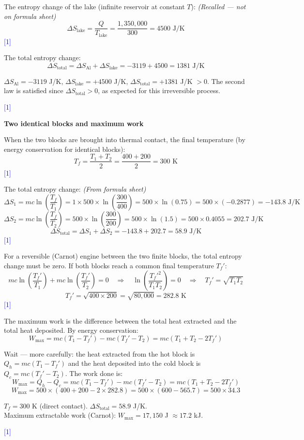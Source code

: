 \documentclass[12pt,a4paper]{article}
\newcommand{\markstep}[1]{\hfill\textcolor{blue}{[#1]}}
\newcommand{\finalanswer}[1]{%
  \begin{tcolorbox}[colback=green!5!white,colframe=green!50!black,boxrule=0.5pt]
  #1
  \end{tcolorbox}
}
\newcommand{\fromsheet}{\textit{(From formula sheet)}}
\newcommand{\recalled}{\textit{(Recalled --- not on formula sheet)}}
\begin{document}
\begin{parts}
The entropy change of the lake (infinite reservoir at constant $T$): \recalled
\[
\Delta S_{\text{lake}} = \frac{Q}{T_{\text{lake}}} = \frac{1{,}350{,}000}{300} = 4500\text{ J/K}
\]
\markstep{1}

The total entropy change:
\[
\Delta S_{\text{total}} = \Delta S_{\text{Al}} + \Delta S_{\text{lake}} = -3119 + 4500 = 1381\text{ J/K}
\]

\finalanswer{$\Delta S_{\text{Al}} = -3119$ J/K, \quad $\Delta S_{\text{lake}} = +4500$ J/K, \quad $\Delta S_{\text{total}} = +1381$ J/K $> 0$. The second law is satisfied since $\Delta S_{\text{total}} > 0$, as expected for this irreversible process.}
\markstep{1}

\item \textbf{Two identical blocks and maximum work} 

When the two blocks are brought into thermal contact, the final temperature (by energy conservation for identical blocks):
\[
T_f = \frac{T_1 + T_2}{2} = \frac{400 + 200}{2} = 300\text{ K}
\]
\markstep{1}

The total entropy change: \fromsheet
\[
\Delta S_1 = mc\ln\!\left(\frac{T_f}{T_1}\right) = 1\times 500\times\ln\!\left(\frac{300}{400}\right) = 500\times\ln(0.75) = 500\times(-0.2877) = -143.8\text{ J/K}
\]
\[
\Delta S_2 = mc\ln\!\left(\frac{T_f}{T_2}\right) = 500\times\ln\!\left(\frac{300}{200}\right) = 500\times\ln(1.5) = 500\times 0.4055 = 202.7\text{ J/K}
\]
\[
\Delta S_{\text{total}} = \Delta S_1 + \Delta S_2 = -143.8 + 202.7 = 58.9\text{ J/K}
\]
\markstep{1}

For a reversible (Carnot) engine between the two finite blocks, the total entropy change must be zero. If both blocks reach a common final temperature $T_f'$:
\[
mc\ln\!\left(\frac{T_f'}{T_1}\right) + mc\ln\!\left(\frac{T_f'}{T_2}\right) = 0 \quad\Longrightarrow\quad \ln\!\left(\frac{T_f'^2}{T_1 T_2}\right) = 0 \quad\Longrightarrow\quad T_f' = \sqrt{T_1 T_2}
\]
\[
T_f' = \sqrt{400\times 200} = \sqrt{80{,}000} = 282.8\text{ K}
\]
\markstep{1}

The maximum work is the difference between the total heat extracted and the total heat deposited. By energy conservation:
\[
W_{\max} = mc(T_1 - T_f') - mc(T_f' - T_2) = mc(T_1 + T_2 - 2T_f')
\]

Wait --- more carefully: the heat extracted from the hot block is $Q_h = mc(T_1 - T_f')$ and the heat deposited into the cold block is $Q_c = mc(T_f' - T_2)$. The work done is:
\[
W_{\max} = Q_h - Q_c = mc(T_1 - T_f') - mc(T_f' - T_2) = mc(T_1 + T_2 - 2T_f')
\]
\[
W_{\max} = 500\times(400 + 200 - 2\times 282.8) = 500\times(600 - 565.7) = 500\times 34.3
\]

\finalanswer{$T_f = 300$ K (direct contact). \quad $\Delta S_{\text{total}} = 58.9$ J/K.\\
Maximum extractable work (Carnot): $W_{\max} = 17{,}150$ J $\approx 17.2$ kJ.}
\markstep{1}

\end{parts}
\end{document}
